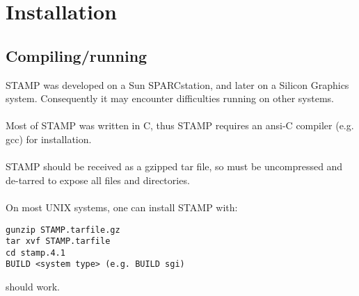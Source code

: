 \chapter{Installation}

\section{Compiling/running}

STAMP was developed on a Sun SPARCstation, and later on a Silicon Graphics
system.  Consequently it may encounter difficulties running on other systems.  \\
\\
Most of STAMP was written in C, thus STAMP requires an ansi-C 
compiler (e.g. gcc) for installation. \\
\\
STAMP should be received as a gzipped tar file, so must be 
uncompressed and de-tarred to expose all files and directories.\\
\\
On most UNIX systems, one can install STAMP with:\\

\begin{scriptsize}\begin{verbatim}
gunzip STAMP.tarfile.gz
tar xvf STAMP.tarfile
cd stamp.4.1
BUILD <system type> (e.g. BUILD sgi)
\end{verbatim} \end{scriptsize}

should work.\\
\\

